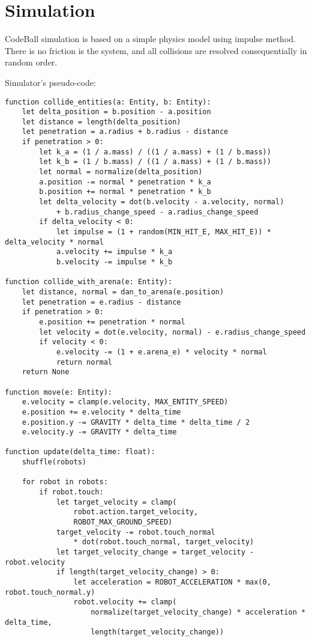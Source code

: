 \chapter{Simulation}

CodeBall simulation is based on a simple physics model using impulse method.
There is no friction is the system, and all collisions are resolved consequentially in random order.

Simulator's pseudo-code:

\begin{verbatim}
function collide_entities(a: Entity, b: Entity):
    let delta_position = b.position - a.position
    let distance = length(delta_position)
    let penetration = a.radius + b.radius - distance
    if penetration > 0:
        let k_a = (1 / a.mass) / ((1 / a.mass) + (1 / b.mass))
        let k_b = (1 / b.mass) / ((1 / a.mass) + (1 / b.mass))
        let normal = normalize(delta_position)
        a.position -= normal * penetration * k_a
        b.position += normal * penetration * k_b
        let delta_velocity = dot(b.velocity - a.velocity, normal)
            + b.radius_change_speed - a.radius_change_speed
        if delta_velocity < 0:
            let impulse = (1 + random(MIN_HIT_E, MAX_HIT_E)) * delta_velocity * normal
            a.velocity += impulse * k_a
            b.velocity -= impulse * k_b

function collide_with_arena(e: Entity):
    let distance, normal = dan_to_arena(e.position)
    let penetration = e.radius - distance
    if penetration > 0:
        e.position += penetration * normal
        let velocity = dot(e.velocity, normal) - e.radius_change_speed
        if velocity < 0:
            e.velocity -= (1 + e.arena_e) * velocity * normal
            return normal
    return None

function move(e: Entity):
    e.velocity = clamp(e.velocity, MAX_ENTITY_SPEED)
    e.position += e.velocity * delta_time
    e.position.y -= GRAVITY * delta_time * delta_time / 2
    e.velocity.y -= GRAVITY * delta_time

function update(delta_time: float):
    shuffle(robots)

    for robot in robots:
        if robot.touch:
            let target_velocity = clamp(
                robot.action.target_velocity,
                ROBOT_MAX_GROUND_SPEED)
            target_velocity -= robot.touch_normal
                * dot(robot.touch_normal, target_velocity)
            let target_velocity_change = target_velocity - robot.velocity
            if length(target_velocity_change) > 0:
                let acceleration = ROBOT_ACCELERATION * max(0, robot.touch_normal.y)
                robot.velocity += clamp(
                    normalize(target_velocity_change) * acceleration * delta_time,
                    length(target_velocity_change))


\end{verbatim}
